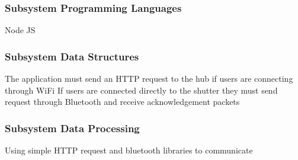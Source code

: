 \subsubsection{Subsystem Programming Languages}
Node JS

\subsubsection{Subsystem Data Structures}
The application must send an HTTP request to the hub if users are connecting through WiFi 
If users are connected directly to the shutter they must send request through Bluetooth and receive acknowledgement packets

\subsubsection{Subsystem Data Processing}
Using simple HTTP request and bluetooth libraries to communicate 



